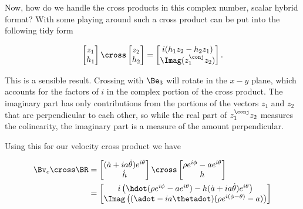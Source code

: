 {Now, how do we handle the cross products in this complex number, scalar hybrid format?  With some playing around such a cross product can be put into the following tidy form

\begin{equation}\label{eqn:relativisticElectrodynamicsExamReflection:960}
\begin{bmatrix}
z_1 \\
h_1
\end{bmatrix}
\cross
\begin{bmatrix}
z_2 \\
h_2
\end{bmatrix}
= 
\begin{bmatrix}
i (h_1 z_2 - h_2 z_1) \\
\Imag(z_1^\conj z_2)
\end{bmatrix}.
\end{equation}

This is a sensible result.  Crossing with $\Be_3$ will rotate in the $x-y$ plane, which accounts for the factors of $i$ in the complex portion of the cross product.  The imaginary part has only contributions from the portions of the vectors $z_1$ and $z_2$ that are perpendicular to each other, so while the real part of $z_1^\conj z_2$ measures the colinearity, the imaginary part is a measure of the amount perpendicular.  

Using this for our velocity cross product we have

\begin{equation}\label{eqn:relativisticElectrodynamicsExamReflection:1310}
\begin{aligned}
\Bv_c \cross \BR 
&=
\begin{bmatrix}
(\dot{a} + i a \dot{\theta}) e^{i\theta} \\
\dot{h}
\end{bmatrix}
\cross
\begin{bmatrix}
\rho e^{i\phi} - a e^{i\theta} \\
h
\end{bmatrix} \\
&=
\begin{bmatrix}
i\left(\hdot ( \rho e^{i\phi} - a e^{i\theta} ) - h (\dot{a} + i a \dot{\theta}) e^{i\theta} \right) \\
\Imag \left( ( \adot - i a \thetadot) (\rho e^{i(\phi - \theta)} - a) \right)
\end{bmatrix} 
\end{aligned}
\end{equation}

}
